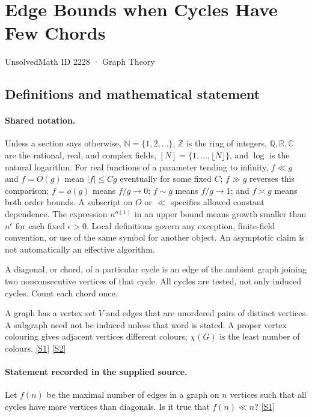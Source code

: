 \documentclass[11pt,a4paper]{article}
\newcommand{\N}{\mathbb{N}}
\newcommand{\Z}{\mathbb{Z}}
\newcommand{\Q}{\mathbb{Q}}
\newcommand{\R}{\mathbb{R}}
\newcommand{\C}{\mathbb{C}}
\newcommand{\sref}[2]{\hyperlink{source:#1:#2}{[S#2]}}
\begin{document}

\setcounter{section}{2227}

\section{Edge Bounds when Cycles Have Few Chords}\label{2228}

{\small\sffamily UnsolvedMath ID 2228 · Graph Theory}

\subsection{Definitions and mathematical statement}

\paragraph{Shared notation.}Unless a section says otherwise, $\N=\{1,2,\ldots\}$,
$\Z$ is the ring of integers, $\Q,\R,\C$ are the rational, real, and complex
fields, $[N]=\{1,\ldots,\lfloor N\rfloor\}$, and $\log$ is the natural
logarithm. For real functions of a parameter tending to infinity,
$f\ll g$ and $f=O(g)$ mean $|f|\leq Cg$ eventually for some fixed $C$;
$f\gg g$ reverses this comparison; $f=o(g)$ means $f/g\to0$;
$f\sim g$ means $f/g\to1$; and $f\asymp g$ means both order bounds.
A subscript on $O$ or $\ll$ specifies allowed constant dependence.
The expression $n^{o(1)}$ in an upper bound means growth smaller than
$n^\epsilon$ for each fixed $\epsilon>0$. Local definitions govern any
exception, finite-field convention, or use of the same symbol for another
object. An asymptotic claim is not automatically an effective algorithm.



A diagonal, or chord, of a particular cycle is an edge of the ambient graph joining two nonconsecutive vertices of that cycle. All cycles are tested, not only induced cycles. Count each chord once.

A graph has a vertex set $V$ and edges that are unordered pairs of distinct vertices. A subgraph need not be induced unless that word is stated. A proper vertex colouring gives adjacent vertices different colours; $\chi(G)$ is the least number of colours. \sref{2228}{1} \sref{2228}{2}

\paragraph{Statement recorded in the supplied source.}
Let $f(n)$ be the maximal number of edges in a graph on $n$ vertices such that all cycles have more vertices than diagonals. Is it true that $f(n)\ll n$? \sref{2228}{1}
\end{document}
